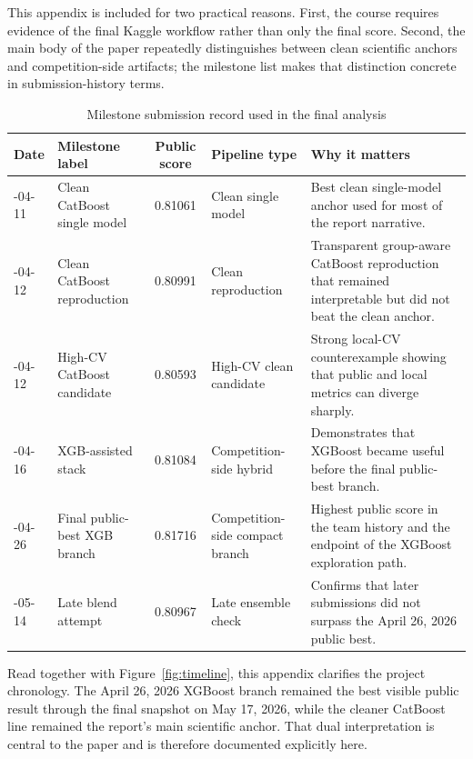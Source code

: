\documentclass[conference]{IEEEtran}
\begin{document}
This appendix is included for two practical reasons. First, the course requires evidence of the final Kaggle workflow rather than only the final score. Second, the main body of the paper repeatedly distinguishes between clean scientific anchors and competition-side artifacts; the milestone list makes that distinction concrete in submission-history terms.

\begin{table}[!t]
\caption{Milestone submission record used in the final analysis}
\label{tab:milestone-record}
\centering
\scriptsize
\begin{tabularx}{\textwidth}{>{\raggedright\arraybackslash}p{}>{\raggedright\arraybackslash}p{}cp{}X}
\toprule
Date & Milestone label & Public score & Pipeline type & Why it matters \\
\midrule
2026-04-11 & Clean CatBoost single model & 0.81061 & Clean single model & Best clean single-model anchor used for most of the report narrative. \\
2026-04-12 & Clean CatBoost reproduction & 0.80991 & Clean reproduction & Transparent group-aware CatBoost reproduction that remained interpretable but did not beat the clean anchor. \\
2026-04-12 & High-CV CatBoost candidate & 0.80593 & High-CV clean candidate & Strong local-CV counterexample showing that public and local metrics can diverge sharply. \\
2026-04-16 & XGB-assisted stack & 0.81084 & Competition-side hybrid & Demonstrates that XGBoost became useful before the final public-best branch. \\
2026-04-26 & Final public-best XGB branch & 0.81716 & Competition-side compact branch & Highest public score in the team history and the endpoint of the XGBoost exploration path. \\
2026-05-14 & Late blend attempt & 0.80967 & Late ensemble check & Confirms that later submissions did not surpass the April 26, 2026 public best. \\
\bottomrule
\end{tabularx}
\end{table}

Read together with Figure~\ref{fig:timeline}, this appendix clarifies the project chronology. The April 26, 2026 XGBoost branch remained the best visible public result through the final snapshot on May 17, 2026, while the cleaner CatBoost line remained the report's main scientific anchor. That dual interpretation is central to the paper and is therefore documented explicitly here.
\end{document}
